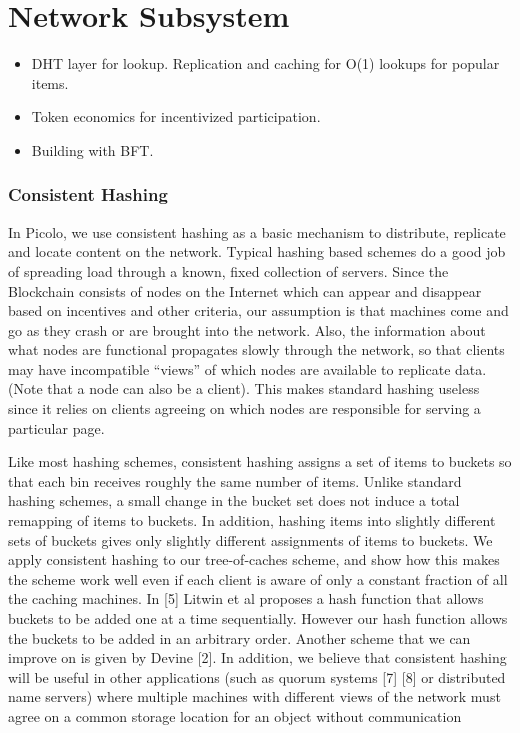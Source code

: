 \section{Network Subsystem}
    \begin{itemize}
        \item DHT layer for lookup. Replication and caching for O(1) lookups for popular items.
        \item Token economics for incentivized participation.
        \item Building with BFT. 
    \end{itemize}


\subsubsection{Consistent Hashing}

In Picolo, we use consistent hashing as a basic mechanism to distribute, replicate and locate content on the network.
Typical hashing based schemes do a good job of spreading load through a known, fixed collection of servers. Since the
Blockchain consists of nodes on the Internet which can appear and disappear based on incentives and other criteria, our
assumption is that machines come and go as they crash or are brought into the network. Also,
the information about what nodes are functional propagates slowly through the
network, so that clients may have incompatible “views” of which nodes are available to replicate data. (Note that a
node can also be a client). This makes standard hashing useless since it relies on clients agreeing on which nodes are responsible for serving a particular
page.


Like most hashing schemes, consistent hashing assigns a set of items to buckets so that
each bin receives roughly the same number of items.  Unlike standard hashing schemes, a small change in the bucket set
does not induce a total remapping of items to buckets. In addition, hashing items into slightly different sets of
buckets gives only slightly different assignments of items to buckets. We apply consistent hashing to our tree-of-caches
scheme, and show how this makes the scheme work well even if each client is aware of only a constant fraction of all the
caching machines. In [5] Litwin et al proposes a hash function that allows buckets to be added one at a time
sequentially. However our hash function allows the buckets to be added in an arbitrary order. Another scheme that we can
improve on is given by Devine [2]. In addition, we believe that consistent hashing will be useful in other applications
(such as quorum systems [7] [8] or distributed name servers) where multiple machines with different views of the network
must agree on a common storage location for an object without communication
